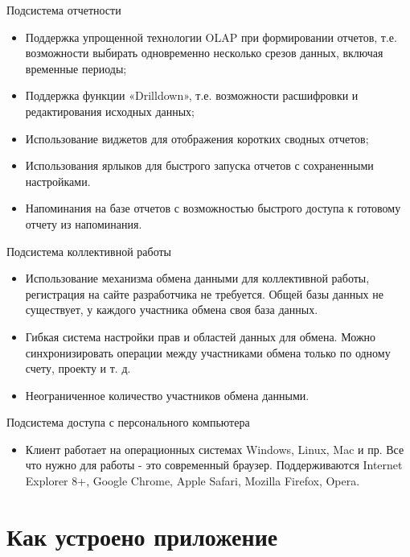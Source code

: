 \documentclass[a4paper,10pt,russian]{sphinxmanual}
\begin{document}
Подсистема отчетности
\begin{itemize}
\item {} 
Поддержка упрощенной технологии OLAP при формировании отчетов, т.е. возможности выбирать одновременно несколько срезов данных, включая временные периоды;

\item {} 
Поддержка функции «Drilldown», т.е. возможности расшифровки и редактирования исходных данных;

\item {} 
Использование виджетов для отображения коротких сводных отчетов;

\item {} 
Использования ярлыков для быстрого запуска отчетов с сохраненными настройками.

\item {} 
Напоминания на базе отчетов с возможностью быстрого доступа к готовому отчету из напоминания.

\end{itemize}

Подсистема коллективной работы
\begin{itemize}
\item {} 
Использование механизма обмена данными для коллективной работы, регистрация на сайте разработчика не требуется. Общей базы данных не существует, у каждого участника обмена своя база данных.

\item {} 
Гибкая система настройки прав и областей данных для обмена. Можно синхронизировать операции между участниками обмена только по одному счету, проекту и т. д.

\item {} 
Неограниченное количество участников обмена данными.

\end{itemize}

Подсистема доступа с персонального компьютера
\begin{itemize}
\item {} 
Клиент работает на операционных системах Windows, Linux, Mac и пр. Все что нужно для работы - это современный браузер. Поддерживаются Internet Explorer 8+, Google Chrome, Apple Safari, Mozilla Firefox, Opera.

\end{itemize}


\chapter{Как устроено приложение}
\label{\detokenize{intro:id1}}\label{\detokenize{intro::doc}}
\end{document}
